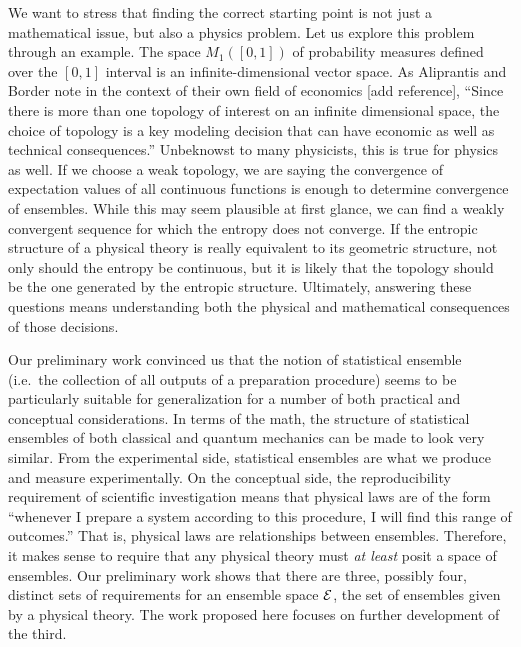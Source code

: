 We want to stress that finding the correct starting point is not just a mathematical issue, but also a physics problem. Let us explore this problem through an example. The space $M_1([0,1])$ of probability measures defined over the $[0,1]$ interval is an infinite-dimensional vector space. As Aliprantis and Border note in the context of their own field of economics [add reference],  ``Since there is more than one topology of interest on an infinite dimensional space, the choice of topology is a key modeling decision that can have economic as well as technical consequences.'' Unbeknowst to many physicists, this is true for physics as well. If we choose a weak topology, we are saying the convergence of expectation values of all continuous functions is enough to determine convergence of ensembles. While this may seem plausible at first glance, we can find a weakly convergent sequence for which the entropy does not converge. If the entropic structure of a physical theory is really equivalent to its geometric structure, not only should the entropy be continuous, but it is likely that the topology should be the one generated by the entropic structure. Ultimately, answering these questions means understanding both the physical and mathematical consequences of those decisions.

Our preliminary work convinced us that the notion of statistical ensemble (i.e.~the collection of all outputs of a preparation procedure) seems to be particularly suitable for generalization for a number of both practical and conceptual considerations. In terms of the math, the structure of statistical ensembles of both classical and quantum mechanics can be made to look very similar. From the experimental side, statistical ensembles are what we produce and measure experimentally. On the conceptual side, the reproducibility requirement of scientific investigation means that physical laws are of the form ``whenever I prepare a system according to this procedure, I will find this range of outcomes.'' That is, physical laws are relationships between ensembles. Therefore, it makes sense to require that any physical theory must \emph{at least} posit a space of ensembles. Our preliminary work shows that there are three, possibly four, distinct sets of requirements for an ensemble space $\mathcal{E}$, the set of ensembles given by a physical theory.  The work proposed here focuses on further development of the third.

